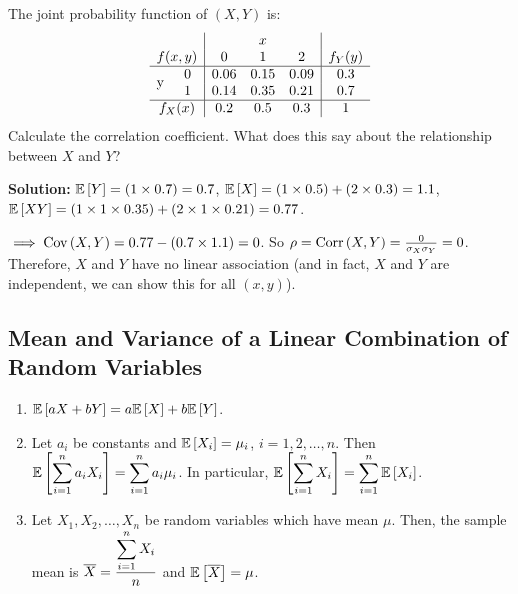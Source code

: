 \begin{example}
    The joint probability function of $(X,Y)$ is:
    \[
        \begin{array}{cc|ccc|c}
            & & \multicolumn{3}{c|}{x} & \\
            \multicolumn{2}{c|}{f(x,y)} & 0 & 1 & 2 & f_Y(y) \\
            \hline
            \multirow{2}{*}{y} 
              & 0 & 0.06 & 0.15 & 0.09 & 0.3 \\
              & 1 & 0.14 & 0.35 & 0.21 & 0.7 \\
            \hline
            \multicolumn{2}{c|}{f_X(x)} & 0.2 & 0.5 & 0.3 & 1
        \end{array}
    \]
    Calculate the correlation coefficient. What does this say about the relationship between $X$ and $Y$?

    \textbf{Solution:} $\mathbb{E}\left[{Y}\right] = (1 \times 0.7) = 0.7$, $\mathbb{E}\left[{X}\right] = (1 \times 0.5) + (2 \times 0.3) = 1.1$, $\mathbb{E}\left[{XY}\right] = (1 \times 1 \times 0.35) + (2 \times 1 \times 0.21) = 0.77$. 

    $\implies \operatorname{Cov}\left({X,Y}\right) = 0.77 - (0.7 \times 1.1) = 0$. So $\rho = \operatorname{Corr}\left({X,Y}\right) = \frac{0}{\sigma_X \sigma_Y} = 0$. \\
    Therefore, $X$ and $Y$ have no linear association (and in fact, $X$ and $Y$ are independent, we can show this for all $(x,y)$).
\end{example}

\subsection{Mean and Variance of a Linear Combination of Random Variables}

\begin{theorem}
    \phantom{}
    \begin{enumerate}
        \item $\mathbb{E}\left[{aX+bY}\right] = a\mathbb{E}\left[{X}\right] + b\mathbb{E}\left[{Y}\right]$.
        \item Let $a_i$ be constants and $\mathbb{E}\left[{X_i}\right] = \mu_i$, $i = 1,2,\ldots ,n$. Then $\mathbb{E}\left[{\displaystyle \sum_{i=1}^{n} a_iX_i}\right] = \displaystyle \sum_{i=1}^{n} a_i \mu_i$. In particular, $\mathbb{E}\left[{\displaystyle \sum_{i=1}^{n} X_i}\right]  = \displaystyle \sum_{i=1}^{n} \mathbb{E}\left[{X_i}\right]$. \vspace{1mm}
        \item Let $X_1, X_2,\ldots , X_n$ be random variables which have mean $\mu$. Then, the sample mean is $\overline{X} = \displaystyle \frac{\displaystyle \sum_{i=1}^{n} X_i}{n}$ and $\mathbb{E}\left[{\overline{X}}\right] = \mu$. 
    \end{enumerate}
\end{theorem}

